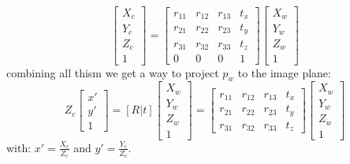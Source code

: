 \documentclass{article}
\begin{document}
$$
\begin{bmatrix}
X_c\\Y_c\\Z_c\\1
\end{bmatrix} = 
\begin{bmatrix}
r_11 & r_12 & r_13 & t_x \\
r_21 & r_22 & r_23 & t_y \\
r_31 & r_32 & r_33 & t_z \\
0 & 0 & 0 &1
\end{bmatrix}
\begin{bmatrix}
X_w\\Y_w\\Z_w\\1
\end{bmatrix}
$$
combining all thism we get a way to project $p_w$ to the image plane:
$$
Z_c\begin{bmatrix}
x'\\y'\\1
\end{bmatrix}
= \left[R|t\right]\begin{bmatrix}
X_w\\Y_w\\Z_w\\1
\end{bmatrix} = 
\begin{bmatrix}
r_11 & r_12 & r_13 & t_x \\
r_21 & r_22 & r_23 & t_y \\
r_31 & r_32 & r_33 & t_z 
\end{bmatrix}
\begin{bmatrix}
X_w\\Y_w\\Z_w\\1
\end{bmatrix}
$$
with: $x' = \frac{X_c}{Z_c}$ and $y' = \frac{Y_c}{Z_c}$.
\end{document}
